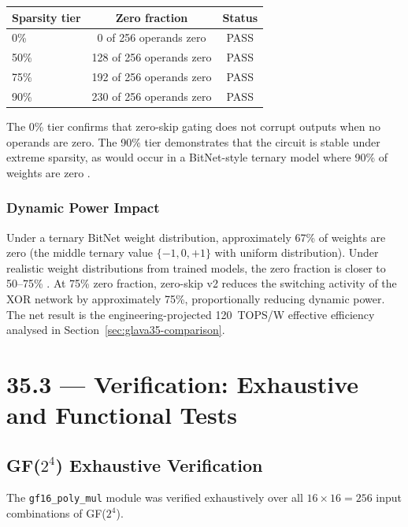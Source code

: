 \begin{center}
\begin{tabular}{lcc}
\toprule
\textbf{Sparsity tier} & \textbf{Zero fraction} & \textbf{Status} \\
\midrule
0\% & 0 of 256 operands zero & PASS \\
50\% & 128 of 256 operands zero & PASS \\
75\% & 192 of 256 operands zero & PASS \\
90\% & 230 of 256 operands zero & PASS \\
\bottomrule
\end{tabular}
\end{center}

The 0\% tier confirms that zero-skip gating does not corrupt outputs when
no operands are zero.
The 90\% tier demonstrates that the circuit is stable under extreme
sparsity, as would occur in a BitNet-style ternary model where 90\% of
weights are zero \cite{ma_bitnet_158}.

\subsubsection{Dynamic Power Impact}

Under a ternary BitNet weight distribution, approximately 67\% of weights
are zero (the middle ternary value \(\{-1, 0, +1\}\) with uniform distribution).
Under realistic weight distributions from trained models, the zero fraction
is closer to 50--75\% \cite{ma_bitnet_158,wang_bitnet_2023}.
At 75\% zero fraction, zero-skip v2 reduces the switching activity of the
XOR network by approximately 75\%, proportionally reducing dynamic power.
The net result is the engineering-projected 120~TOPS/W effective efficiency
analysed in Section~\ref{sec:glava35-comparison}.

\section{35.3 --- Verification: Exhaustive and Functional Tests}
\label{sec:glava35-verification}

\subsection{GF(\(2^4\)) Exhaustive Verification}

The \texttt{gf16\_poly\_mul} module was verified exhaustively over all
\(16 \times 16 = 256\) input combinations of GF(\(2^4\)).

